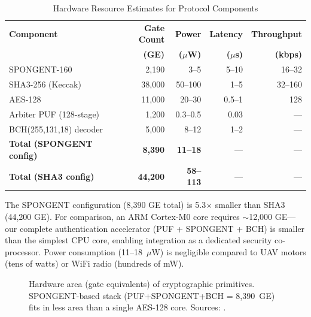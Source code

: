 \documentclass[11pt,a4paper]{article}
\begin{document}
\begin{table}[H]
\centering
\caption{Hardware Resource Estimates for Protocol Components}
\label{tab:hw_area}
\begin{tabular}{@{}lrrrr@{}}
\toprule
\textbf{Component} & \textbf{Gate Count} & \textbf{Power} & \textbf{Latency} & \textbf{Throughput} \\
& \textbf{(GE)} & \textbf{($\mu$W)} & \textbf{($\mu$s)} & \textbf{(kbps)} \\
\midrule
SPONGENT-160 & 2,190 & 3--5 & 5--10 & 16--32 \\
SHA3-256 (Keccak) & 38,000 & 50--100 & 1--5 & 32--160 \\
AES-128 & 11,000 & 20--30 & 0.5--1 & 128 \\
Arbiter PUF (128-stage) & 1,200 & 0.3--0.5 & 0.03 & --- \\
BCH(255,131,18) decoder & 5,000 & 8--12 & 1--2 & --- \\
\midrule
\textbf{Total (SPONGENT config)} & \textbf{8,390} & \textbf{11--18} & --- & --- \\
\textbf{Total (SHA3 config)} & \textbf{44,200} & \textbf{58--113} & --- & --- \\
\bottomrule
\end{tabular}
\end{table}

The SPONGENT configuration (8,390 GE total) is 5.3$\times$ smaller than SHA3 (44,200 GE). For comparison, an ARM Cortex-M0 core requires $\sim$12,000 GE---our complete authentication accelerator (PUF + SPONGENT + BCH) is smaller than the simplest CPU core, enabling integration as a dedicated security co-processor. Power consumption (11--18~$\mu$W) is negligible compared to UAV motors (tens of watts) or WiFi radio (hundreds of mW).

\begin{figure}[H]
\centering
{}
\caption{Hardware area (gate equivalents) of cryptographic primitives. SPONGENT-based stack (PUF+SPONGENT+BCH = 8{,}390~GE) fits in less area than a single AES-128 core. Sources: \cite{spongent_original, lightweight_crypto_evaluation, sram_puf_bch, arbiter_puf_iot}.}
\label{fig:hw_area_bar}
\end{figure}
\end{document}
